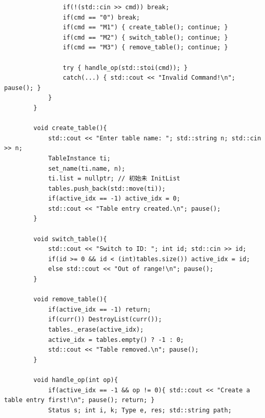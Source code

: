 \documentclass[supercite]{Experimental_Report}
\theoremstyle{definition}
\begin{document}
\begin{lstlisting}
				if(!(std::cin >> cmd)) break;
				if(cmd == "0") break;
				if(cmd == "M1") { create_table(); continue; }
				if(cmd == "M2") { switch_table(); continue; }
				if(cmd == "M3") { remove_table(); continue; }
				
				try { handle_op(std::stoi(cmd)); } 
				catch(...) { std::cout << "Invalid Command!\n"; pause(); }
			}
		}
		
		void create_table(){
			std::cout << "Enter table name: "; std::string n; std::cin >> n;
			TableInstance ti;
			set_name(ti.name, n);
			ti.list = nullptr; // 初始未 InitList
			tables.push_back(std::move(ti));
			if(active_idx == -1) active_idx = 0;
			std::cout << "Table entry created.\n"; pause();
		}
		
		void switch_table(){
			std::cout << "Switch to ID: "; int id; std::cin >> id;
			if(id >= 0 && id < (int)tables.size()) active_idx = id;
			else std::cout << "Out of range!\n"; pause();
		}
		
		void remove_table(){
			if(active_idx == -1) return;
			if(curr()) DestroyList(curr());
			tables._erase(active_idx);
			active_idx = tables.empty() ? -1 : 0;
			std::cout << "Table removed.\n"; pause();
		}
		
		void handle_op(int op){
			if(active_idx == -1 && op != 0){ std::cout << "Create a table entry first!\n"; pause(); return; }
			Status s; int i, k; Type e, res; std::string path;
			

\end{lstlisting}
\end{document}
